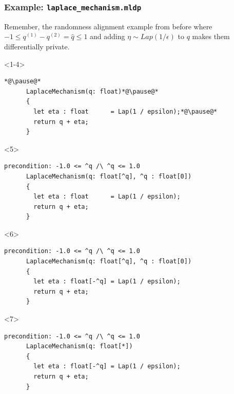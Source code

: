 \documentclass[english, aspectratio=169]{beamer}
\begin{document}
\begin{frame}[fragile]
  \frametitle{Example: \lstinline{laplace_mechanism.mldp}}
  
  Remember, the randomness alignment example from before where $-1 \leq q^{(1)}
  - q^{(2)} = \hat{q} \leq 1$ and adding $\eta \sim \mathit{Lap}(1/\epsilon)$ to
  $q$ makes them differentially private.

  \vspace{1em}

  \begin{onlyenv}<1-4>
    \begin{lstlisting}[language=none]
      *@\pause@*
      LaplaceMechanism(q: float)*@\pause@*
      {
        let eta : float      = Lap(1 / epsilon);*@\pause@*
        return q + eta;
      }
    \end{lstlisting}
  \end{onlyenv}
  \begin{onlyenv}<5>
    \begin{lstlisting}[language=none]
      precondition: -1.0 <= ^q /\ ^q <= 1.0
      LaplaceMechanism(q: float[^q], ^q : float[0])
      {
        let eta : float      = Lap(1 / epsilon);
        return q + eta;
      }
    \end{lstlisting}
  \end{onlyenv}
  \begin{onlyenv}<6>
    \begin{lstlisting}[language=none]
      precondition: -1.0 <= ^q /\ ^q <= 1.0
      LaplaceMechanism(q: float[^q], ^q : float[0])
      {
        let eta : float[-^q] = Lap(1 / epsilon);
        return q + eta;
      }
    \end{lstlisting}
  \end{onlyenv}
  \begin{onlyenv}<7>
    \begin{lstlisting}[language=none]
      precondition: -1.0 <= ^q /\ ^q <= 1.0
      LaplaceMechanism(q: float[*])
      {
        let eta : float[-^q] = Lap(1 / epsilon);
        return q + eta;
      }
    \end{lstlisting}
  \end{onlyenv}
\end{frame}
\end{document}
